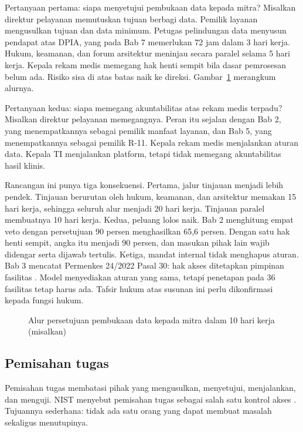 \begin{kasus}[title={Kasus Medikara Health: Dua Pertanyaan C3}]
Pertanyaan pertama: siapa menyetujui pembukaan data kepada mitra? Misalkan direktur pelayanan
memutuskan tujuan berbagi data. Pemilik layanan mengusulkan tujuan dan data minimum. Petugas
pelindungan data menyusun pendapat atas DPIA, yang pada Bab 7 memerlukan 72 jam dalam 3 hari
kerja. Hukum, keamanan, dan forum arsitektur meninjau secara paralel selama 5 hari kerja. Kepala
rekam medis memegang hak henti sempit bila dasar pemrosesan belum ada. Risiko sisa di atas batas
naik ke direksi. Gambar~\ref{fig:ch08-alur-data} merangkum alurnya.

Pertanyaan kedua: siapa memegang akuntabilitas atas rekam medis terpadu? Misalkan direktur
pelayanan memegangnya. Peran itu sejalan dengan Bab 2, yang menempatkannya sebagai pemilik manfaat
layanan, dan Bab 5, yang menempatkannya sebagai pemilik R-11. Kepala rekam medis menjalankan aturan
data. Kepala TI menjalankan platform, tetapi tidak memegang akuntabilitas hasil klinis.

Rancangan ini punya tiga konsekuensi. Pertama, jalur tinjauan menjadi lebih pendek. Tinjauan
berurutan oleh hukum, keamanan, dan arsitektur memakan 15 hari kerja, sehingga seluruh alur
menjadi 20 hari kerja. Tinjauan paralel membuatnya 10 hari kerja. Kedua, peluang lolos naik. Bab 2
menghitung empat veto dengan persetujuan 90 persen menghasilkan 65,6 persen. Dengan satu hak henti
sempit, angka itu menjadi 90 persen, dan masukan pihak lain wajib didengar serta dijawab tertulis.
Ketiga, mandat internal tidak menghapus aturan. Bab 3 mencatat Permenkes 24/2022 Pasal 30: hak
akses ditetapkan pimpinan fasilitas \cite{permenkes24-2022}. Model menyediakan aturan yang sama,
tetapi penetapan pada 36 fasilitas tetap harus ada. Tafsir hukum atas susunan ini perlu
dikonfirmasi kepada fungsi hukum.
\end{kasus}

\begin{figure}[!htb]
  \centering
  
  \caption{Alur persetujuan pembukaan data kepada mitra dalam 10 hari kerja (misalkan)}
  \label{fig:ch08-alur-data}
\end{figure}

\subsection*{Pemisahan tugas}

Pemisahan tugas membatasi pihak yang mengusulkan, menyetujui, menjalankan, dan menguji. NIST
menyebut pemisahan tugas sebagai salah satu kontrol akses \cite{c08-nist-sp80012r1}. Tujuannya
sederhana: tidak ada satu orang yang dapat membuat masalah sekaligus menutupinya.

